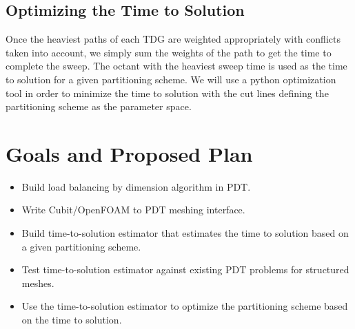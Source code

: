 \documentclass[11pt, letterpaper,titlepage,oneside]{article}
\begin{document}
\subsection{Optimizing the Time to Solution}

Once the heaviest paths of each TDG are weighted appropriately with conflicts taken into account, we simply sum the weights of the path to get the time to complete the sweep. The octant with the heaviest sweep time is used as the time to solution for a given partitioning scheme. We will use a python optimization tool in order to minimize the time to solution with the cut lines defining the partitioning scheme as the parameter space.

\section{Goals and Proposed Plan}

\begin{itemize}
\item Build load balancing by dimension algorithm in PDT.
\item Write Cubit/OpenFOAM to PDT meshing interface. 
\item Build time-to-solution estimator that estimates the time to solution based on a given partitioning scheme.
\item Test time-to-solution estimator against existing PDT problems for structured meshes.
\item Use the time-to-solution estimator to optimize the partitioning scheme based on the time to solution. 
\end{itemize}




\end{document}
